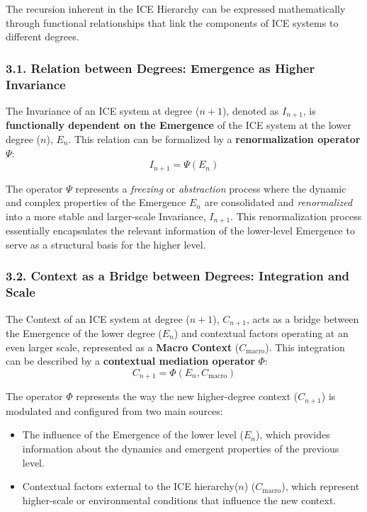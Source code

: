 \documentclass{article}
\begin{document}
The recursion inherent in the ICE Hierarchy can be expressed mathematically through functional relationships that link the components of ICE systems to different degrees.

\subsubsection{3.1. Relation between Degrees: Emergence as Higher Invariance}

The Invariance of an ICE system at degree ($n+1$), denoted as $I_{n+1}$, is \textbf{functionally dependent on the Emergence} of the ICE system at the lower degree ($n$), $E_n$. This relation can be formalized by a \textbf{renormalization operator} $\Psi$:
\begin{equation*}
    I_{n+1} = \Psi(E_n)
\end{equation*}

The operator $\Psi$ represents a \textit{freezing} or \textit{abstraction} process where the dynamic and complex properties of the Emergence $E_n$ are consolidated and \textit{renormalized} into a more stable and larger-scale Invariance, $I_{n+1}$. This renormalization process essentially encapsulates the relevant information of the lower-level Emergence to serve as a structural basis for the higher level.

\subsubsection{3.2. Context as a Bridge between Degrees: Integration and Scale}

The Context of an ICE system at degree ($n+1$), $C_{n+1}$, acts as a bridge between the Emergence of the lower degree ($E_n$) and contextual factors operating at an even larger scale, represented as a \textbf{Macro Context} ($C_{\text{macro}}$). This integration can be described by a \textbf{contextual mediation operator} $\Phi$:
\begin{equation*}
    C_{n+1} = \Phi(E_n, C_{\text{macro}})
\end{equation*}

The operator $\Phi$ represents the way the new higher-degree context ($C_{n+1}$) is modulated and configured from two main sources:
\begin{itemize}
\item The influence of the Emergence of the lower level ($E_n$), which provides information about the dynamics and emergent properties of the previous level.
\item Contextual factors external to the ICE hierarchy($n$) ($C_{\text{macro}}$), which represent higher-scale or environmental conditions that influence the new context.
\end{itemize}
\end{document}
